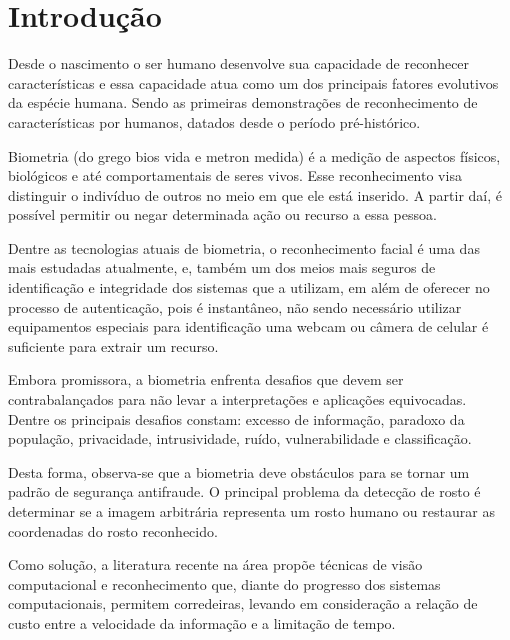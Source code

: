 
\chapter{Introdução}\label{cap:introducao}

Desde o nascimento o ser humano desenvolve sua capacidade de reconhecer características 
e essa capacidade atua como um dos principais fatores evolutivos da espécie humana. 
Sendo as primeiras demonstrações de reconhecimento de características por humanos, 
datados desde o período pré-histórico.

Biometria (do grego bios vida e metron medida) é a medição de aspectos físicos, 
biológicos e até comportamentais de seres vivos. Esse reconhecimento visa distinguir o indivíduo de 
outros no meio em que ele está inserido. A partir daí, é possível permitir ou negar determinada 
ação ou recurso a essa pessoa.

Dentre as tecnologias atuais de biometria, o reconhecimento facial é uma das mais estudadas 
atualmente, e, também um dos meios mais seguros de identificação e integridade dos 
sistemas que a utilizam, em além de oferecer no processo de autenticação, pois é 
instantâneo, não sendo necessário utilizar equipamentos especiais para identificação uma webcam ou 
câmera de celular é suficiente para extrair um recurso.

Embora promissora, a biometria enfrenta desafios que devem ser contrabalançados para 
não levar a interpretações e aplicações equivocadas. Dentre os principais desafios constam: 
excesso de informação, paradoxo da população, privacidade, intrusividade, ruído, vulnerabilidade 
e classificação.

Desta forma, observa-se que a biometria deve obstáculos para se tornar um padrão de 
segurança antifraude. O principal problema da detecção de rosto é determinar se a imagem 
arbitrária representa um rosto humano ou restaurar as coordenadas do rosto reconhecido.

Como solução, a literatura recente na área propõe técnicas de visão computacional e 
reconhecimento que, diante do progresso dos sistemas computacionais, permitem corredeiras, 
levando em consideração a relação de custo entre a velocidade da informação e a limitação de 
tempo.

